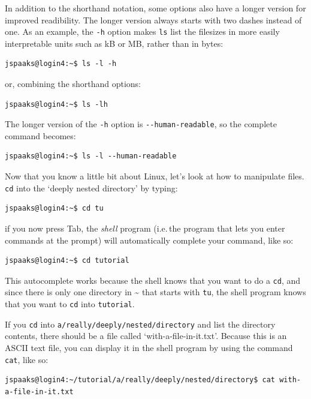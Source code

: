 In addition to the shorthand notation, some options also have a longer version for improved readibility. The longer version always starts with two dashes instead of one. As an example, the \lstinline[style=bashinline]{-h} option makes \lstinline[style=bashinline]{ls} list the filesizes in more easily interpretable units such as kB or MB, rather than in bytes:
\begin{lstlisting}[style=basic,style=bash]
jspaaks@login4:~$ ls -l -h
\end{lstlisting}
or, combining the shorthand options:
\begin{lstlisting}[style=basic,style=bash]
jspaaks@login4:~$ ls -lh
\end{lstlisting}
The longer version of the \lstinline[style=bashinline]{-h} option is \lstinline[style=bashinline]{--human-readable}, so the complete command becomes: 
\begin{lstlisting}[style=basic,style=bash]
jspaaks@login4:~$ ls -l --human-readable
\end{lstlisting}


Now that you know a little bit about Linux, let's look at how to manipulate files. \lstinline[style=bashinline]{cd} into the `deeply nested directory' by typing:
\begin{lstlisting}[style=basic,style=bash]
jspaaks@login4:~$ cd tu
\end{lstlisting}
if you now press Tab, the \textit{shell} program (i.e.\,the program that lets you enter commands at the prompt) will automatically complete your command, like so:
\begin{lstlisting}[style=basic,style=bash]
jspaaks@login4:~$ cd tutorial
\end{lstlisting}
This autocomplete works because the shell knows that you want to do a \lstinline[style=bashinline]{cd}, and since there is only one directory in \textasciitilde{} that starts with \lstinline[style=bashinline]{tu}, the shell program knows that you want to \lstinline[style=bashinline]{cd} into \lstinline[style=bashinline]{tutorial}.

If you \lstinline[style=bashinline]{cd} into \lstinline{a/really/deeply/nested/directory} and list the directory contents, there should be a file called `with-a-file-in-it.txt'. Because this is an \mbox{ASCII} text file, you can display it in the shell program by using the command \lstinline[style=bashinline]{cat}, like so:
\begin{lstlisting}[style=basic,style=bash]
jspaaks@login4:~/tutorial/a/really/deeply/nested/directory$ cat with-a-file-in-it.txt
\end{lstlisting}

